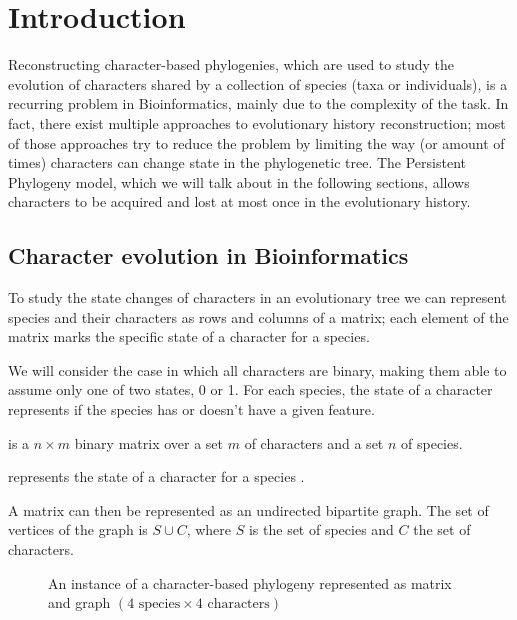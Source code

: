 
\section{Introduction}\label{sec:introduction}


Reconstructing character-based phylogenies, which are used to study the evolution of characters shared by a collection of species (taxa or individuals), is a recurring problem in Bioinformatics, mainly due to the complexity of the task. In fact, there exist multiple approaches to evolutionary history reconstruction; most of those approaches try to reduce the problem by limiting the way (or amount of times) characters can change state in the phylogenetic tree. The Persistent Phylogeny model, which we will talk about in the following sections, allows characters to be acquired and lost at most once in the evolutionary history.

\subsection{Character evolution in Bioinformatics}\label{ssec:charevo}


To study the state changes of characters in an evolutionary tree we can represent species and their characters as rows and columns of a matrix; each element of the matrix marks the specific state of a character for a species.

We will consider the case in which all characters are binary, making them able to assume only one of two states, 0 or 1. For each species, the state of a character represents if the species has or doesn't have a given feature.

\begin{definition}\label{def:m}
  \m{} is a $n \times m$ binary matrix over a set $m$ of characters and a set $n$ of species.

  \m[i][j] represents the state of a character \character[j] for a species \species[i].
\end{definition}

A matrix \m{} can then be represented as an undirected bipartite graph. The set of vertices of the graph is $S \cup C$, where $S$ is the set of species and $C$ the set of characters.

\begin{figure}[h]
  

  \caption{An instance of a character-based phylogeny represented as matrix and graph $(\text{4 species} \times \text{4 characters})$}
  \label{fig:1}
\end{figure}

